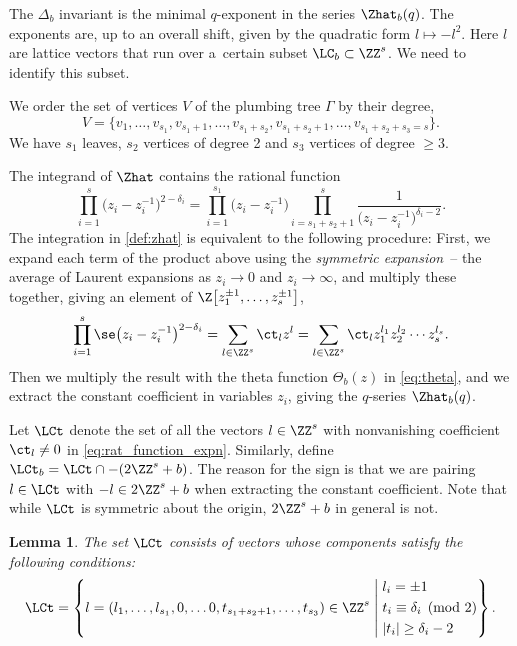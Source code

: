 \documentclass[10pt,a4paper]{amsart}
\newcounter{theorem}
\newtheorem{Lemma}[Theorem]{Lemma}
\begin{document}
The $\Delta_b$ invariant is the minimal $q$-exponent in the series $\Zhat_b(q)$. The exponents are, up to an overall shift, given by the quadratic form $l \mapsto -l^2$. Here $l$ are lattice vectors that run over a~certain subset $\LC_b \subset \ZZ^s$. We need to identify this subset.

We order the set of vertices $V$ of the plumbing tree $\Gamma$ by their degree,
\[
 V = \{v_1, \dots, v_{s_1}, v_{s_{1}+1}, \dots, v_{s_{1}+s_{2}}, v_{s_{1}+s_{2}+1}, \dots, v_{s_{1}+s_{2} + s_{3} = s}\}.
\]
We have $s_1$ leaves, $s_2$ vertices of degree 2 and $s_3$ vertices of degree $\geq 3$.

The integrand of $\Zhat$ contains the rational function
\begin{equation}\label{eq:rat_function}
 \prod_{i=1}^s\bigl(z_i- z_i^{-1}\bigr)^{2-\delta_i} = \prod_{i=1}^{s_1} \bigl(z_i-z_i^{-1}\bigr) \prod_{i=s_1+s_2+1}^{s} \frac{1}{\bigl(z_i-z_i^{-1}\bigr)^{\delta_i-2}}.
\end{equation}
The integration in \eqref{def:zhat} is equivalent to the following procedure: First, we expand each term of the product above using the \emph{symmetric expansion}~-- the average of Laurent expansions as $z_i \rightarrow 0$ and $z_i \rightarrow \infty$, and multiply these together, giving an element of $\Z\bigl[z_1^{\pm 1},\dots, z_s^{\pm 1}\bigr]$,
\begin{equation}\label{eq:rat_function_expn}
 \prod_{i=1}^s \se \bigl(z_i- z_i^{-1}\bigr)^{2-\delta_i} = \sum_{l \in \ZZ^s} \ct_l z^l = \sum_{l \in \ZZ^s} \ct_l z_1^{l_1}z_2^{l_2}\cdots z_s^{l_s}.
\end{equation}
Then we multiply the result with the theta function $\Theta_b(z)$ in \eqref{eq:theta}, and we extract the constant coefficient in variables $z_i$, giving the $q$-series $\Zhat_b(q)$.

Let $\LCt$ denote the set of all the vectors $l \in \ZZ^s$ with nonvanishing coefficient $\ct_l \neq 0$ in \eqref{eq:rat_function_expn}. Similarly, define $\LCt_b = \LCt \cap -(2\ZZ^s+b)$. The reason for the sign is that we are pairing $l \in \LCt$ with $-l \in 2\ZZ^s+b$ when extracting the constant coefficient. Note that while $\LCt$ is symmetric about the origin, $2\ZZ^s+b$ in general is not.

\begin{Lemma}\label{description-c}
The set $\LCt$ consists of vectors whose components satisfy the following conditions:
 \[\LCt =
 \left\{l=(l_1,\dots,l_{s_1}, 0, \dots 0, t_{s_1+s_2+1}, \dots, t_{s_3}) \in \ZZ^s
 \;\middle\vert\;
 \begin{aligned}
 &l_i = \pm 1 \\
 &t_i \equiv \delta_i \pmod{2} \\
 &\lvert t_i \rvert \geq \delta_i-2
 \end{aligned}
 \right\}.
\]
\end{Lemma}
\end{document}
